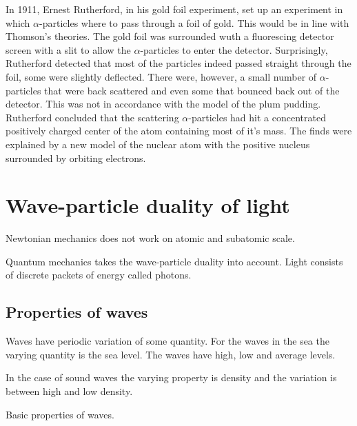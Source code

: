 \documentclass[../mit-general-chemistry.tex]{subfiles}
\begin{document}
In 1911, Ernest Rutherford, in his gold foil experiment, set up an
experiment in which $\alpha$-particles where to pass through a foil of
gold. This would be in line with Thomson's theories. The gold foil was
surrounded wuth a fluorescing detector screen with a slit to allow the
$\alpha$-particles to enter the detector. Surprisingly, Rutherford
detected that most of the particles indeed passed straight through the
foil, some were slightly deflected. There were, however, a small
number of $\alpha$-particles that were back scattered and even some
that bounced back out of the detector. This was not in accordance with
the model of the plum pudding. Rutherford concluded that the
scattering $\alpha$-particles had hit a concentrated positively
charged center of the atom containing most of it's mass. The finds
were explained by a new model of the nuclear atom with the positive
nucleus surrounded by orbiting electrons.



\section{Wave-particle duality of light}

Newtonian mechanics does not work on atomic and subatomic scale.

Quantum mechanics takes the wave-particle duality into account. Light
consists of discrete packets of energy called photons.


\subsection{Properties of waves}


Waves have periodic variation of some quantity. For the waves in the
sea the varying quantity is the sea level. The waves have high, low
and average levels.

In the case of sound waves the varying property is density and the
variation is between high and low density.


\begin{hfigure}
  \begin{center}
  \end{center}
  \caption{Basic properties of waves.}
\end{hfigure}
\end{document}
